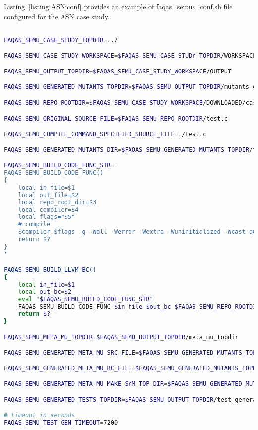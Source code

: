 Listing~\ref{listing:ASN:conf} provides an example of faqas\_semus\_conf.sh file configured for the ASN case study.

\begin{lstlisting}[language=bash,label=listing:ASN:conf,caption=faqas\_semus\_conf.sh file for ASN case study.]

FAQAS_SEMU_CASE_STUDY_TOPDIR=../

FAQAS_SEMU_CASE_STUDY_WORKSPACE=$FAQAS_SEMU_CASE_STUDY_TOPDIR/WORKSPACE

FAQAS_SEMU_OUTPUT_TOPDIR=$FAQAS_SEMU_CASE_STUDY_WORKSPACE/OUTPUT

FAQAS_SEMU_GENERATED_MUTANTS_TOPDIR=$FAQAS_SEMU_OUTPUT_TOPDIR/mutants_generation

FAQAS_SEMU_REPO_ROOTDIR=$FAQAS_SEMU_CASE_STUDY_WORKSPACE/DOWNLOADED/casestudy

FAQAS_SEMU_ORIGINAL_SOURCE_FILE=$FAQAS_SEMU_REPO_ROOTDIR/test.c

FAQAS_SEMU_COMPILE_COMMAND_SPECIFIED_SOURCE_FILE=./test.c

FAQAS_SEMU_GENERATED_MUTANTS_DIR=$FAQAS_SEMU_GENERATED_MUTANTS_TOPDIR/test

FAQAS_SEMU_BUILD_CODE_FUNC_STR='
FAQAS_SEMU_BUILD_CODE_FUNC()
{
    local in_file=$1
    local out_file=$2
    local repo_root_dir=$3
    local compiler=$4
    local flags="$5"
    # compile
    $compiler $flags -g -Wall -Werror -Wextra -Wuninitialized -Wcast-qual -Wshadow -Wundef -fdiagnostics-show-option -D_DEBUG -I $repo_root_dir -O0 $in_file -o $out_file $flags
    return $?
}
'

FAQAS_SEMU_BUILD_LLVM_BC()
{
    local in_file=$1
    local out_bc=$2
    eval "$FAQAS_SEMU_BUILD_CODE_FUNC_STR"
    FAQAS_SEMU_BUILD_CODE_FUNC $in_file $out_bc $FAQAS_SEMU_REPO_ROOTDIR clang '-c -emit-llvm'
    return $?
}

FAQAS_SEMU_META_MU_TOPDIR=$FAQAS_SEMU_OUTPUT_TOPDIR/meta_mu_topdir

FAQAS_SEMU_GENERATED_META_MU_SRC_FILE=$FAQAS_SEMU_GENERATED_MUTANTS_TOPDIR/test.MetaMu.c

FAQAS_SEMU_GENERATED_META_MU_BC_FILE=$FAQAS_SEMU_GENERATED_MUTANTS_TOPDIR/test.MetaMu.bc

FAQAS_SEMU_GENERATED_META_MU_MAKE_SYM_TOP_DIR=$FAQAS_SEMU_GENERATED_MUTANTS_TOPDIR/"MakeSym-TestGen-Input"

FAQAS_SEMU_GENERATED_TESTS_TOPDIR=$FAQAS_SEMU_OUTPUT_TOPDIR/test_generation

# timeout in seconds
FAQAS_SEMU_TEST_GEN_TIMEOUT=7200


\end{lstlisting}
